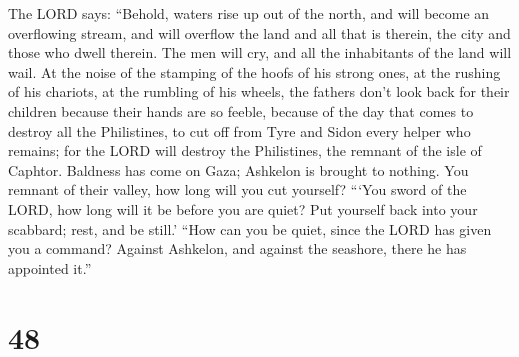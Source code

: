  The LORD says: ``Behold, waters rise up out of the north,
and will become an overflowing stream, and will overflow the land and
all that is therein, the city and those who dwell therein. The men will
cry, and all the inhabitants of the land will wail.  At
the noise of the stamping of the hoofs of his strong ones, at the
rushing of his chariots, at the rumbling of his wheels, the fathers
don't look back for their children because their hands are so feeble,
 because of the day that comes to destroy all the
Philistines, to cut off from Tyre and Sidon every helper who remains;
for the LORD will destroy the Philistines, the remnant of the isle of
Caphtor.  Baldness has come on Gaza; Ashkelon is brought
to nothing. You remnant of their valley, how long will you cut yourself?
 ```You sword of the LORD, how long will it be before you
are quiet? Put yourself back into your scabbard; rest, and be still.'
 ``How can you be quiet, since the LORD has given you a
command? Against Ashkelon, and against the seashore, there he has
appointed it.''

\hypertarget{section-47}{%
\section{48}\label{section-47}}

